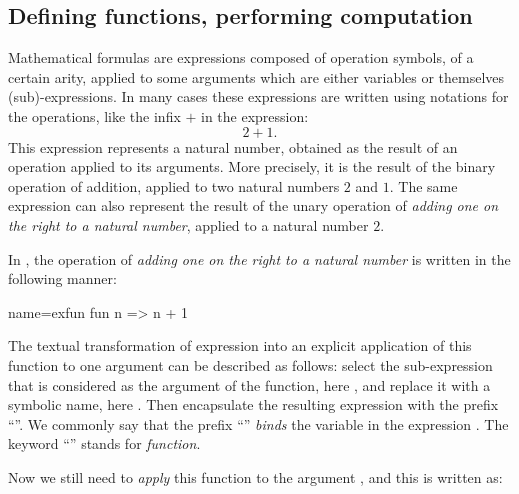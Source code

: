 \subsection{Defining functions, performing
  computation}\label{ssec:deffun}
Mathematical formulas are expressions composed of operation symbols,
of a certain arity, applied to some arguments which are
either variables or themselves (sub)-expressions.
In many cases these
expressions are written using notations for the operations, like the
infix $+$ in the expression:
\[ 2 + 1. \]
This expression represents a natural number, obtained as the result of
an operation applied to its arguments.  More precisely, it is the result
of the binary operation of addition, applied to two natural numbers
$2$ and $1$. The same expression can also represent the result of the
unary operation of {\em adding one on the right to a natural number},
applied to a natural number $2$.

In \Coq{}, the operation of {\em adding one on the right to a natural number} is
written in the following manner:

\begin{coq}{name=exfun}{}
  fun n => n + 1
\end{coq}
The textual transformation of expression  into an
explicit application of this function to one argument can be
described as follows: select the sub-expression that is considered as
the argument of the function, here , and replace it with a
symbolic name, here . Then encapsulate the resulting expression
 with the prefix ``''. We commonly
say that the prefix ``'' \emph{binds} the variable  in the
expression . The keyword ``'' stands for
\emph{function}.

Now we still need to \emph{apply} this function to the argument
, and this is written as:

